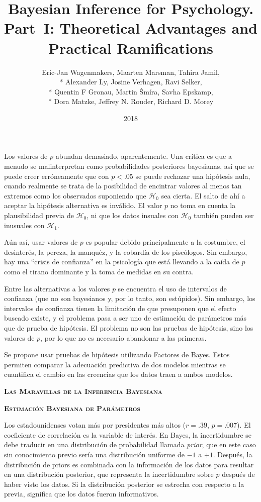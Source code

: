 \documentclass[a4paper,12pt]{article}
\title{Bayesian Inference for Psychology. Part~I: Theoretical Advantages and Practical Ramifications}
\author{Eric-Jan Wagenmakers, Maarten Marsman, Tahira Jamil,\\*
	Alexander Ly, Josine Verhagen, Ravi Selker,\\*
	Quentin F Gronau, Martin Ŝmíra, Savha Epskamp,\\*
	Dora Matzke, Jeffrey N. Rouder, Richard D. Morey}
\date{2018}
\begin{document}
{\scshape\bfseries \maketitle}

Los valores de $p$ abundan demasiado, aparentemente. Una crítica es que a menudo se malinterpretan como probabilidades posteriores bayesianas, así que se puede creer erróneamente que con $p< .05$ se puede rechazar una hipótesis nula, cuando realmente se trata de la posibilidad de encintrar valores al menos tan extremos como los observados suponiendo que $\mathcal H_0$ sea cierta. El salto de ahí a aceptar la hipótesis alternativa es inválido. El valor $p$ no toma en cuenta la plausibilidad previa de $\mathcal H_0$, ni que los datos insuales con $\mathcal H_0$ también pueden ser inusuales con $\mathcal H_1$.

Aún así, usar valores de $p$ es popular debido principalmente a la costumbre, el desinterés, la pereza, la manquéz, y la cobardía de los piscólogos. Sin embargo, hay una ``crisis de confianza'' en la psicología que está llevando a la caída de $p$ como el tirano dominante y la toma de medidas en su contra.

Entre las alternativas a los valores $p$ se encuentra el uso de intervalos de confianza (que no son bayesianos y, por lo tanto, son estúpidos). Sin embargo, los intervalos de confianza tienen la limitación de que presuponen que el efecto buscado existe, y el problema pasa a ser uno de estimación de parámetros más que de prueba de hipótesis. El problema no son las pruebas de hipótesis, sino los valores de $p$, por lo que no es necesario abandonar a las primeras.

Se propone usar pruebas de hipótesis utilizando Factores de Bayes. Estos permiten comparar la adecuación predictiva de dos modelos mientras se cuantifica el cambio en las creencias que los datos traen a ambos modelos.

{\scshape\bfseries Las Maravillas de la Inferencia Bayesiana}

{\scshape\bfseries Estimación Bayesiana de Parámetros}

Los estadounidenses votan más por presidentes más altos ($r={.}39$, $p={.}007$). El coeficiente de correlación es la variable de interés. En Bayes, la incertidumbre se debe traducir en una distribución de probabilidad llamada {\slshape prior}, que en este caso sin conocimiento previo sería una distribución uniforme de $-1$ a $+1$. Después, la distribución de priors es combinada con la información de los datos para resultar en una distribución posterior, que representa la incertidumbre sobre $p$ después de haber visto los datos. Si la distribución posterior se estrecha con respecto a la previa, significa que los datos fueron informativos.
\end{document}
